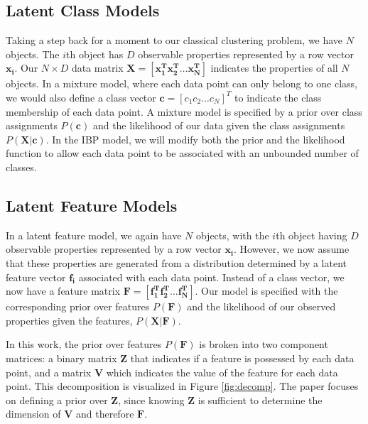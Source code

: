 \documentclass[twoside]{article}
\begin{document}
\subsection{Latent Class Models}
Taking a step back for a moment to our classical clustering problem, we have $N$ objects. The $i$th object has $D$ observable properties represented by a row vector $\mathbf{x_i}$. Our $N \times D$ data matrix $\mathbf{X} = [\mathbf{x_1^T x_2^T \dots x_N^T}]$ indicates the properties of all $N$ objects. In a mixture model, where each data point can only belong to one class, we would also define a class vector $\mathbf{c} = [c_1 c_2 \dots c_N]^T$ to indicate the class membership of each data point. A mixture model is specified by a prior over class assignments $P(\mathbf{c})$ and the likelihood of our data given the class assignments $P(\mathbf{X | c})$. In the IBP model, we will modify both the prior and the likelihood function to allow each data point to be associated with an unbounded number of classes.

\subsection{Latent Feature Models}
In a latent feature model, we again have $N$ objects, with the $i$th object having $D$ observable properties represented by a row vector $\mathbf{x_i}$. However, we now assume that these properties are generated from a distribution determined by a latent feature vector $\mathbf{f_i}$ associated with each data point. Instead of a class vector, we now have a feature matrix $\mathbf{F} = [\mathbf{f_1^T f_2^T \dots f_N^T}]$. Our model is specified with the corresponding prior over features $P(\mathbf{F})$ and the likelihood of our observed properties given the features, $P(\mathbf{X | F})$.

In this work, the prior over features $P(\mathbf{F})$ is broken into two component matrices: a binary matrix $\mathbf{Z}$ that indicates if a feature is possessed by each data point, and a matrix $\mathbf{V}$ which indicates the value of the feature for each data point. This decomposition is visualized in Figure \ref{fig:decomp}. The paper focuses on defining a prior over $\mathbf{Z}$, since knowing $\mathbf{Z}$ is sufficient to determine the dimension of $\mathbf{V}$ and therefore $\mathbf{F}$.
\end{document}

